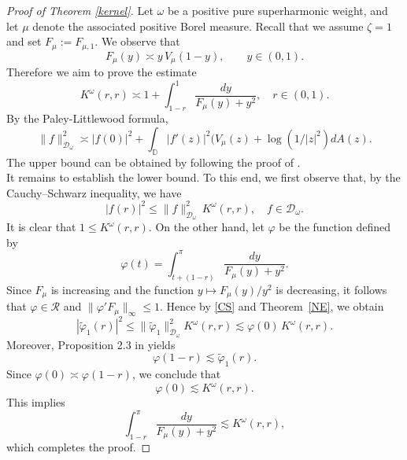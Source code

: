 \documentclass[12pt,reqno,a4paper]{amsart}
\newcommand\DD{\mathbb{D}}
\newcommand{\cD}{{\mathcal{D}}}
\numberwithin{equation}{section}
\begin{document}
	\begin{proof}[Proof of Theorem \ref{kernel}]
		Let $\omega$ be a positive pure superharmonic weight, and let $\mu$ denote the associated positive Borel measure. Recall that we assume $\zeta =1$ and set $F_\mu:= F_{\mu,1}$. We observe that
		\[
		F_\mu(y) \asymp y\, V_\mu(1 - y), \qquad y \in (0,1).
		\]
		Therefore we aim to prove the estimate
		$$
		K^\omega(r, r) \asymp 1+ \displaystyle \int ^1_{1-r}\frac{dy}{F_\mu(y)+y^2},\quad r\in (0,1).
		$$
		By the Paley-Littlewood formula,
		$$
		\| f\| ^2_{\cD _\omega} \asymp |f(0)|^2+ \displaystyle \int _\DD |f'(z)|^2(V_\mu(z)+\log(1/|z|^2)dA(z).
		$$
		The upper bound can be obtained by following the proof of \cite[Theorem~1]{EEK18}.\\
		
		\noindent %
		It remains to establish the lower bound. To this end, we first observe that, by the Cauchy--Schwarz inequality, we have
		\begin{equation}\label{CS}
			|f(r)|^2 \leq \| f \|^2_{\mathcal{D}_\omega}\, K^{\omega}(r,r), \quad f \in \mathcal{D}_\omega.
		\end{equation}
		It is clear that $1 \leq K^{\omega}(r,r)$. On the other hand, let $\varphi$ be the function defined by
		\begin{equation}\label{FI}
			\varphi(t) = \int_{t+(1-r)}^\pi \frac{dy}{F_\mu(y) + y^2}.
		\end{equation}
		Since $F_\mu$ is increasing and the function $y \mapsto F_\mu(y)/y^2$ is decreasing, it follows that $\varphi \in \mathcal{R}$ and $\|\varphi' F_\mu\|_{\infty} \leq 1$. Hence by \eqref{CS} and Theorem~\ref{NE}, we obtain
		\[
		|\tilde{\varphi}_1(r)|^2 \leq \| \tilde{\varphi}_1 \|^2_{\mathcal{D}_\omega} K^{\omega}(r,r)
		\lesssim \varphi(0)\, K^{\omega}(r,r).
		\]
		Moreover, Proposition 2.3 in \cite{EEK18} yields
		\[
		\varphi(1-r) \lesssim \tilde{\varphi}_1(r).
		\]
		Since $\varphi(0) \asymp \varphi(1-r)$, we conclude that
		\[
		\varphi(0) \lesssim K^{\omega}(r,r).
		\]
		This implies
		\[
		\int_{1-r}^\pi \frac{dy}{F_\mu(y) + y^2} \lesssim K^{\omega}(r,r),
		\]
		which completes the proof.
	\end{proof}
	
\end{document}
